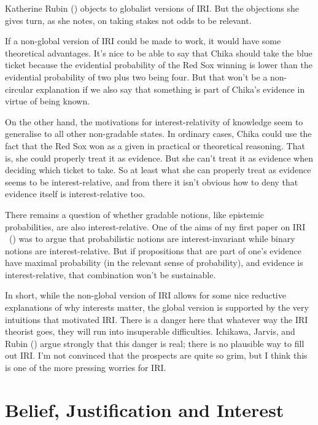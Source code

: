 \documentclass[
  10pt,
  letterpaper,
  DIV=11,
  numbers=noendperiod,
  twoside]{scrartcl}
\begin{document}
Katherine Rubin () objects to globalist
versions of IRI. But the objections she gives turn, as she notes, on
taking stakes not odds to be relevant.

If a non-global version of IRI could be made to work, it would have some
theoretical advantages. It's nice to be able to say that Chika should
take the blue ticket because the evidential probability of the Red Sox
winning is lower than the evidential probability of two plus two being
four. But that won't be a non-circular explanation if we also say that
something is part of Chika's evidence in virtue of being known.

On the other hand, the motivations for interest-relativity of knowledge
seem to generalise to all other non-gradable states. In ordinary cases,
Chika could use the fact that the Red Sox won as a given in practical or
theoretical reasoning. That is, she could properly treat it as evidence.
But she can't treat it as evidence when deciding which ticket to take.
So at least what she can properly treat as evidence seems to be
interest-relative, and from there it isn't obvious how to deny that
evidence itself is interest-relative too.

There remains a question of whether gradable notions, like epistemic
probabilities, are also interest-relative. One of the aims of my first
paper on IRI ~() was to
argue that probabilistic notions are interest-invariant while binary
notions are interest-relative. But if propositions that are part of
one's evidence have maximal probability (in the relevant sense of
probability), and evidence is interest-relative, that combination won't
be sustainable.

In short, while the non-global version of IRI allows for some nice
reductive explanations of why interests matter, the global version is
supported by the very intuitions that motivated IRI. There is a danger
here that whatever way the IRI theorist goes, they will run into
insuperable difficulties. Ichikawa, Jarvis, and Rubin
() argue strongly that this danger
is real; there is no plausible way to fill out IRI. I'm not convinced
that the prospects are quite so grim, but I think this is one of the
more pressing worries for IRI.

\section{Belief, Justification and
Interest}\label{beliefjustificationandinterest}
\end{document}

